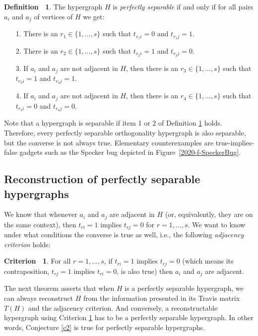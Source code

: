 \documentclass[%
12pt,
prereprint,
showpacs,
showkeys,
preprintnumbers,
amsmath,amssymb,
aps,
pra,
longbibliography,
notitlepage
]{revtex4-1}
\theoremstyle{definition}
\newtheorem{definition}[theorem]{{\color{THM}Definition\ }}
\newtheorem{criterion}[theorem]{{\color{THM}Criterion\ }}
\begin{document}
        \begin{definition}\label{separability}
                The hypergraph $H$ is \emph{perfectly separable} if and only if for all pairs $a_i$ and $a_j$ of vertices of $H$ we get:
                \begin{itemize}
                        \item[1.] There is an $r_1 \in \{1,\ldots,s\}$ such that $t_{r_1 i}=0$ and $t_{r_1 j}=1$.
                        \item[2.] There is an $r_2 \in \{1,\ldots,s\}$  such that $t_{r_2 i}=1$ and $t_{r_2 j}=0$.
                        \item[3.] If $a_i$ and $a_j$ are not adjacent in $H$, then there is an $r_3 \in \{1,\ldots,s\}$  such that $t_{r_3 i}=1$ and $t_{r_3 j}=1$.
                        \item[4.] If $a_i$ and $a_j$ are not adjacent in $H$, then there is an $r_4 \in \{1,\ldots,s\}$ such that $t_{r_4 i}=0$ and $t_{r_4 j}=0$.
                \end{itemize}

                Note that a hypergraph is separable if item 1 or 2 of Definition \ref{separability} holds. Therefore, every perfectly separable orthogonality hypergraph is also separable, but the converse is not always true.
                Elementary counterexamples are true-implies-false gadgets such as the Specker bug depicted in Figure~\ref{2020-f-SpeckerBug}.

        \end{definition}

        \subsection{Reconstruction of perfectly separable hypergraphs}\label{Rec-PSH}

        We know that whenever $a_i$ and $a_j$ are adjacent in $H$ (or, equivalently, they are on the same context), then $t_{ri}=1$  implies $t_{rj}=0$ for $r=1,\ldots,s$. We want to know under what conditions the converse is true as well, i.e., the following \emph{adjacency criterion} holds:
        \begin{criterion}
                \label{AdCr} For all $r=1,\ldots,s$, if $t_{ri}=1$ implies $t_{rj}=0$ (which means its contraposition, $t_{rj}=1$ implies $t_{ri}=0$, is also true) then $a_i$ and $a_j$ are adjacent.
        \end{criterion}

        The next theorem asserts that when $H$ is a perfectly separable hypergraph, we can always reconstruct $H$ from the information presented in its Travis matrix $T(H)$ and the adjacency criterion. And conversely, a reconstructable hypergraph using Criterion \ref{AdCr} has to be a perfectly separable hypergraph. In other words, Conjecture \ref{c2} is true for perfectly separable hypergraphs.
\end{document}
